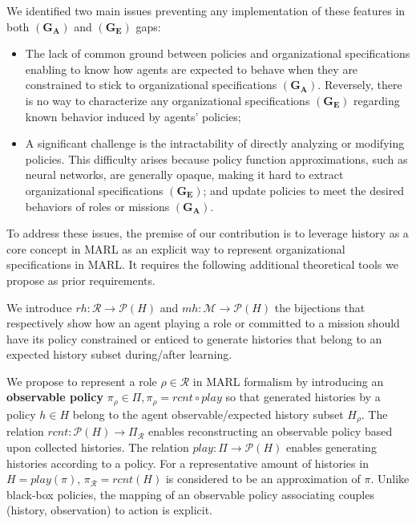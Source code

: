 \documentclass[runningheads]{llncs}
\newcounter{relation}
\begin{document}
\noindent We identified two main issues preventing any implementation of these features in both $(\mathbf{G_A})$ and $(\mathbf{G_E})$ gaps:

\begin{itemize}[wide, labelsep = 1em]
    \item The lack of common ground between policies and organizational specifications enabling to know how agents are expected to behave when they are constrained to stick to organizational specifications $(\mathbf{G_A})$. Reversely, there is no way to characterize any organizational specifications $(\mathbf{G_E})$ regarding known behavior induced by agents' policies;
    \item A significant challenge is the intractability of directly analyzing or modifying policies. This difficulty arises because policy function approximations, such as neural networks, are generally opaque, making it hard to extract organizational specifications $(\mathbf{G_E})$; and update policies to meet the desired behaviors of roles or missions $(\mathbf{G_A})$.
\end{itemize}

To address these issues, the premise of our contribution is to leverage history as a core concept in MARL as an explicit way to represent organizational specifications in MARL. It requires the following additional theoretical tools we propose as prior requirements.

We introduce $rh: \mathcal{R} \rightarrow \mathcal{P}(H)$ and $mh: \mathcal{M} \rightarrow \mathcal{P}(H)$ the bijections that respectively show how an agent playing a role or committed to a mission should have its policy constrained or enticed to generate histories that belong to an expected history subset during/after learning.

We propose to represent a role $\rho \in \mathcal{R}$ in MARL formalism by introducing an \textbf{observable policy} $\pi_{\rho} \in \Pi, \pi_{\rho} = rcnt \circ play$ so that generated histories by a policy $h \in H$ belong to the agent observable/expected history subset $H_{\rho}$. The relation $rcnt: \mathcal{P}(H) \rightarrow \Pi_{\mathcal{R}}$ enables reconstructing an observable policy based upon collected histories. The relation $play: \Pi \rightarrow \mathcal{P}(H)$ enables generating histories according to a policy. For a representative amount of histories in $H = play(\pi)$, $\pi_{\mathcal{R}} = rcnt(H)$ is considered to be an approximation of $\pi$.
Unlike black-box policies, the mapping of an observable policy associating couples (history, observation) to action is explicit.
\end{document}
